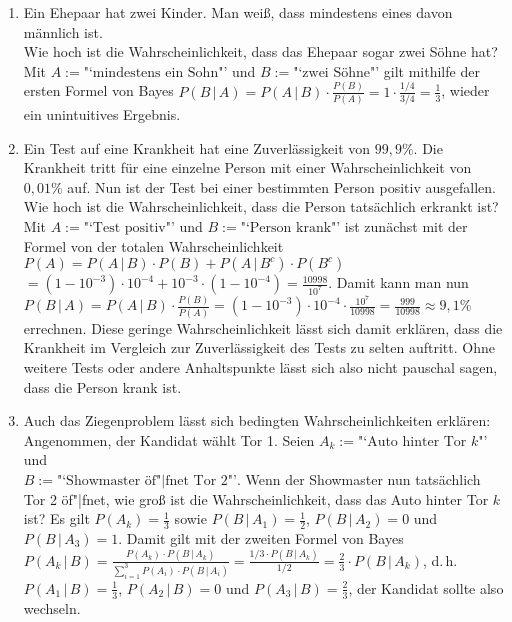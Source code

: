 \begin{Bsp}
    \begin{enumerate}
        \item
        Ein Ehepaar hat zwei Kinder.
        Man weiß, dass mindestens eines davon männlich ist.\\
        Wie hoch ist die Wahrscheinlichkeit, dass das Ehepaar sogar zwei Söhne hat?\\
        Mit $A := \text{"`mindestens ein Sohn"'}$ und $B := \text{"`zwei Söhne"'}$ gilt
        mithilfe der ersten Formel von Bayes
        $P(B \,|\, A) = P(A \,|\, B) \cdot \frac{P(B)}{P(A)} = 1 \cdot \frac{1/4}{3/4} =
        \frac{1}{3}$, wieder ein unintuitives Ergebnis.

        \item
        Ein Test auf eine Krankheit hat eine Zuverlässigkeit von $99{,}9\%$.
        Die Krankheit tritt für eine einzelne Person mit einer Wahrscheinlichkeit von
        $0{,}01\%$ auf.
        Nun ist der Test bei einer bestimmten Person positiv ausgefallen.
        Wie hoch ist die Wahrscheinlichkeit, dass die Person tatsächlich erkrankt ist?\\
        Mit $A := \text{"`Test positiv"'}$ und $B := \text{"`Person krank"'}$ ist zunächst
        mit der Formel von der totalen Wahrscheinlichkeit
        $P(A) = P(A \,|\, B) \cdot P(B) + P(A \,|\, B^c) \cdot P(B^c)$\\
        $= (1 - 10^{-3}) \cdot 10^{-4} + 10^{-3} \cdot (1 - 10^{-4}) = \frac{10998}{10^7}$.
        Damit kann man nun\\
        $P(B \,|\, A) = P(A \,|\, B) \cdot \frac{P(B)}{P(A)}
        = (1 - 10^{-3}) \cdot 10^{-4} \cdot \frac{10^7}{10998} =
        \frac{999}{10998} \approx 9{,}1\%$ errechnen.
        Diese geringe Wahrscheinlichkeit lässt sich damit erklären, dass die Krankheit im Vergleich
        zur Zuverlässigkeit des Tests zu selten auftritt.
        Ohne weitere Tests oder andere Anhaltspunkte lässt sich also nicht pauschal sagen, dass
        die Person krank ist.

        \item
        Auch das Ziegenproblem lässt sich bedingten Wahrscheinlichkeiten erklären:\\
        Angenommen, der Kandidat wählt Tor 1.
        Seien $A_k := \text{"`Auto hinter Tor } k \text{"'}$ und\\
        $B := \text{"`Showmaster öf"|fnet Tor } 2 \text{"'}$.
        Wenn der Showmaster nun tatsächlich Tor 2 öf"|fnet, wie groß ist die Wahrscheinlichkeit,
        dass das Auto hinter Tor $k$ ist?
        Es gilt $P(A_k) = \frac{1}{3}$ sowie $P(B \,|\, A_1) = \frac{1}{2}$,
        $P(B \,|\, A_2) = 0$ und $P(B \,|\, A_3) = 1$.
        Damit gilt mit der zweiten Formel von Bayes
        $P(A_k \,|\, B) = \frac{P(A_k) \cdot P(B \,|\, A_k)}
        {\sum_{i=1}^3 P(A_i) \cdot P(B \,|\, A_i)} = \frac{1/3 \cdot P(B \,|\, A_k)}{1/2} =
        \frac{2}{3} \cdot P(B \,|\, A_k)$,
        d.\,h. $P(A_1 \,|\, B) = \frac{1}{3}$, $P(A_2 \,|\, B) = 0$ und
        $P(A_3 \,|\, B) = \frac{2}{3}$, der Kandidat sollte also wechseln.
    \end{enumerate}
\end{Bsp}

